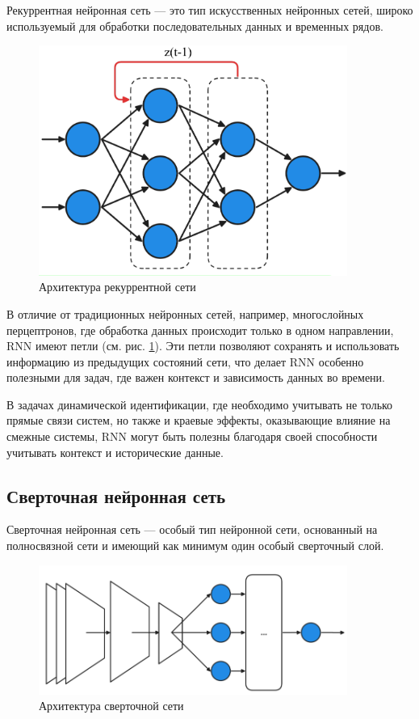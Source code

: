 Рекуррентная нейронная сеть — это тип искусственных нейронных сетей, широко
используемый для обработки последовательных данных и временных рядов. 

\begin{figure}[H]
  \centering
    \includegraphics[width=0.9\textwidth]{figures/arch_rnn.png}
  \caption{Архитектура рекуррентной сети}\label{fig:rnn}
\end{figure}

В отличие от традиционных нейронных сетей, например, многослойных перцептронов,
где обработка данных происходит только в одном направлении, RNN имеют петли (см.
рис. \ref{fig:rnn}). Эти петли позволяют сохранять и использовать информацию из
предыдущих состояний сети, что делает RNN особенно полезными для задач, где
важен контекст и зависимость данных во времени. 

В задачах динамической идентификации, где необходимо учитывать не только прямые
связи систем, но также и краевые эффекты, оказывающие влияние на смежные
системы, RNN могут быть полезны благодаря своей способности учитывать контекст и
исторические данные.

\subsection{Сверточная нейронная сеть}

Сверточная нейронная сеть — особый тип нейронной сети, основанный на
полносвязной сети и имеющий как минимум один особый сверточный слой. 

\begin{figure}[H]
  \centering
    \includegraphics[width=0.9\textwidth]{figures/arch_cnn.png}
  \caption{Архитектура сверточной сети}\label{fig:cnn}
\end{figure}

